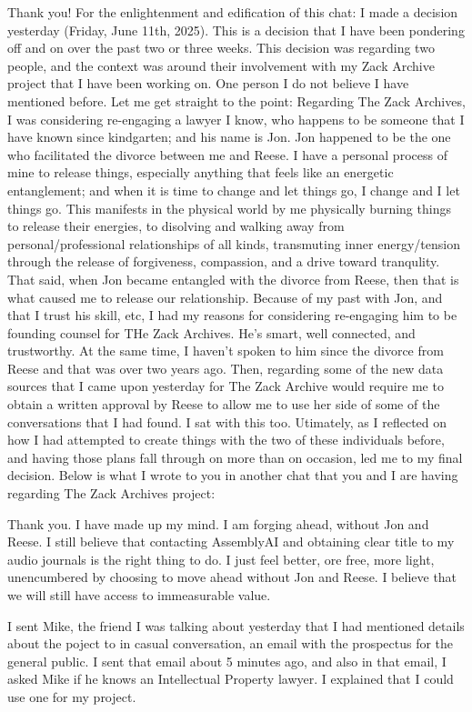 \documentclass{article}
\begin{document}
Thank you! For the enlightenment and edification of this chat: I made a
decision yesterday (Friday, June 11th, 2025). This is a decision that I
have been pondering off and on over the past two or three weeks. This
decision was regarding two people, and the context was around their
involvement with my Zack Archive project that I have been working on.
One person I do not believe I have mentioned before. Let me get straight
to the point: Regarding The Zack Archives, I was considering re-engaging
a lawyer I know, who happens to be someone that I have known since
kindgarten; and his name is Jon. Jon happened to be the one who
facilitated the divorce between me and Reese. I have a personal process
of mine to release things, especially anything that feels like an
energetic entanglement; and when it is time to change and let things go,
I change and I let things go. This manifests in the physical world by me
physically burning things to release their energies, to disolving and
walking away from personal/professional relationships of all kinds,
transmuting inner energy/tension through the release of forgiveness,
compassion, and a drive toward tranqulity. That said, when Jon became
entangled with the divorce from Reese, then that is what caused me to
release our relationship. Because of my past with Jon, and that I trust
his skill, etc, I had my reasons for considering re-engaging him to be
founding counsel for THe Zack Archives. He's smart, well connected, and
trustworthy. At the same time, I haven't spoken to him since the divorce
from Reese and that was over two years ago. Then, regarding some of the
new data sources that I came upon yesterday for The Zack Archive would
require me to obtain a written approval by Reese to allow me to use her
side of some of the conversations that I had found. I sat with this too.
Utimately, as I reflected on how I had attempted to create things with
the two of these individuals before, and having those plans fall through
on more than on occasion, led me to my final decision. Below is what I
wrote to you in another chat that you and I are having regarding The
Zack Archives project:

Thank you. I have made up my mind. I am forging ahead, without Jon and
Reese. I still believe that contacting AssemblyAI and obtaining clear
title to my audio journals is the right thing to do. I just feel better,
ore free, more light, unencumbered by choosing to move ahead without Jon
and Reese. I believe that we will still have access to immeasurable
value.

I sent Mike, the friend I was talking about yesterday that I had
mentioned details about the poject to in casual conversation, an email
with the prospectus for the general public. I sent that email about 5
minutes ago, and also in that email, I asked Mike if he knows an
Intellectual Property lawyer. I explained that I could use one for my
project.
\end{document}
